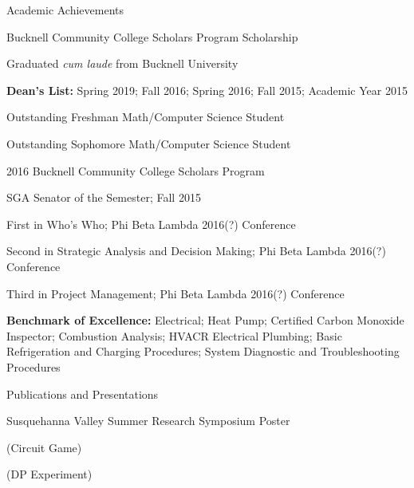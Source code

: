 \documentclass{resume} %
\newcommand{\tab}[1]{\hspace{.2667\textwidth}\rlap{#1}}
\newcommand{\itab}[1]{\hspace{0em}\rlap{#1}}
\begin{document}
\begin{rSection}{Academic Achievements} \itemsep -2pt
\item Bucknell Community College Scholars Program Scholarship
\item Graduated {\it cum laude} from Bucknell University
\item {\bf Dean's List:} Spring 2019; Fall 2016; Spring 2016; Fall 2015; Academic Year 2015
\item Outstanding Freshman Math/Computer Science Student
\item Outstanding Sophomore Math/Computer Science Student
\item 2016 Bucknell Community College Scholars Program
\item SGA Senator of the Semester; Fall 2015
\item First in Who's Who; Phi Beta Lambda 2016(?) Conference
\item Second in Strategic Analysis and Decision Making; Phi Beta Lambda 2016(?) Conference
\item Third in Project Management; Phi Beta Lambda 2016(?) Conference
\item {\bf Benchmark of Excellence:} Electrical; Heat Pump; Certified Carbon Monoxide Inspector; Combustion Analysis; HVACR Electrical Plumbing; Basic Refrigeration and Charging Procedures; System Diagnostic and Troubleshooting Procedures


\end{rSection}
\fi

\iffalse
\begin{rSection}{Publications and Presentations} \itemsep -2pt
\item Susquehanna Valley Summer Research Symposium Poster
\item (Circuit Game)
\item (DP Experiment)

\end{rSection}

\iffalse
\begin{rSection}{Relevant Courses}
\itab{\textbf{Core Courses}} \tab{}  \tab{\textbf{Other Courses}}
\\ \itab{Discrete Structures} \tab{}  \tab{Computer Organization \& Programming}
\\ \itab{Calculus III} \tab{}  \tab{Operating Systems} 
\\ \itab{Algorithms} \tab{}  \tab{Logic} 
\\ \itab{Life, Computers \& Everything} \tab{} \tab{Linear Algebra}
\\ \itab{Software Engineering and Design} \tab{} \tab{Cognitive Science (Audit)}

\end{rSection}
\fi
\end{document}
